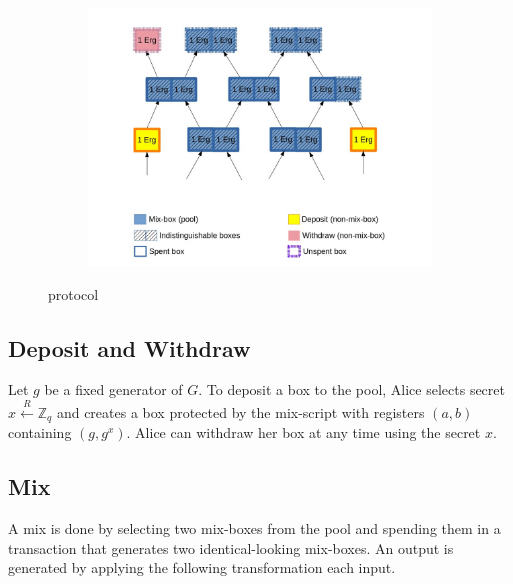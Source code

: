 \documentclass[runningheads]{llncs}
\newcommand{\rand}{\stackrel{R}{\leftarrow}}
\begin{document}
\begin{figure}[h]
    \centering
    \begin{subfigure}{.8\textwidth}
        \centering
        \includegraphics[width=\linewidth]{Sigmajoin.jpg}
    \end{subfigure}%
    \caption{\algname protocol}
    \label{fig:sigmajoin}
\end{figure}

\subsection{Deposit and Withdraw}

Let $g$ be a fixed generator of $G$. To deposit a box to the pool, Alice selects secret $x\rand \mathbb{Z}_q$ and creates a box protected by the mix-script with registers $(a, b)$ containing $(g, g^x)$. Alice can withdraw her box at any time using the secret $x$.

\subsection{Mix}
\label{mix}

A mix is done by selecting two mix-boxes from the pool and spending them in a transaction that generates two identical-looking mix-boxes. An output is generated by applying the following transformation each input.
\end{document}
